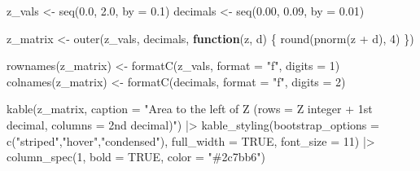 \documentclass[
  12pt,
  letterpaper,
]{book}
\newenvironment{Shaded}{\begin{snugshade}}{\end{snugshade}}
\newcommand{\AttributeTok}[1]{\textcolor[rgb]{0.40,0.45,0.13}{#1}}
\newcommand{\ConstantTok}[1]{\textcolor[rgb]{0.56,0.35,0.01}{#1}}
\newcommand{\ControlFlowTok}[1]{\textcolor[rgb]{0.00,0.23,0.31}{\textbf{#1}}}
\newcommand{\DecValTok}[1]{\textcolor[rgb]{0.68,0.00,0.00}{#1}}
\newcommand{\FloatTok}[1]{\textcolor[rgb]{0.68,0.00,0.00}{#1}}
\newcommand{\FunctionTok}[1]{\textcolor[rgb]{0.28,0.35,0.67}{#1}}
\newcommand{\NormalTok}[1]{\textcolor[rgb]{0.00,0.23,0.31}{#1}}
\newcommand{\OtherTok}[1]{\textcolor[rgb]{0.00,0.23,0.31}{#1}}
\newcommand{\SpecialCharTok}[1]{\textcolor[rgb]{0.37,0.37,0.37}{#1}}
\newcommand{\StringTok}[1]{\textcolor[rgb]{0.13,0.47,0.30}{#1}}
\begin{document}
\begin{Shaded}
\begin{Highlighting}[]
\NormalTok{z\_vals }\OtherTok{\textless{}{-}} \FunctionTok{seq}\NormalTok{(}\FloatTok{0.0}\NormalTok{, }\FloatTok{2.0}\NormalTok{, }\AttributeTok{by =} \FloatTok{0.1}\NormalTok{)}
\NormalTok{decimals }\OtherTok{\textless{}{-}} \FunctionTok{seq}\NormalTok{(}\FloatTok{0.00}\NormalTok{, }\FloatTok{0.09}\NormalTok{, }\AttributeTok{by =} \FloatTok{0.01}\NormalTok{)}

\NormalTok{z\_matrix }\OtherTok{\textless{}{-}} \FunctionTok{outer}\NormalTok{(z\_vals, decimals, }\ControlFlowTok{function}\NormalTok{(z, d) \{}
  \FunctionTok{round}\NormalTok{(}\FunctionTok{pnorm}\NormalTok{(z }\SpecialCharTok{+}\NormalTok{ d), }\DecValTok{4}\NormalTok{)}
\NormalTok{\})}

\FunctionTok{rownames}\NormalTok{(z\_matrix) }\OtherTok{\textless{}{-}} \FunctionTok{formatC}\NormalTok{(z\_vals, }\AttributeTok{format =} \StringTok{"f"}\NormalTok{, }\AttributeTok{digits =} \DecValTok{1}\NormalTok{)}
\FunctionTok{colnames}\NormalTok{(z\_matrix) }\OtherTok{\textless{}{-}} \FunctionTok{formatC}\NormalTok{(decimals, }\AttributeTok{format =} \StringTok{"f"}\NormalTok{, }\AttributeTok{digits =} \DecValTok{2}\NormalTok{)}

\FunctionTok{kable}\NormalTok{(z\_matrix, }\AttributeTok{caption =} \StringTok{"Area to the left of Z (rows = Z integer + 1st decimal, columns = 2nd decimal)"}\NormalTok{) }\SpecialCharTok{|\textgreater{}}
  \FunctionTok{kable\_styling}\NormalTok{(}\AttributeTok{bootstrap\_options =} \FunctionTok{c}\NormalTok{(}\StringTok{"striped"}\NormalTok{,}\StringTok{"hover"}\NormalTok{,}\StringTok{"condensed"}\NormalTok{),}
                \AttributeTok{full\_width =} \ConstantTok{TRUE}\NormalTok{, }\AttributeTok{font\_size =} \DecValTok{11}\NormalTok{) }\SpecialCharTok{|\textgreater{}}
  \FunctionTok{column\_spec}\NormalTok{(}\DecValTok{1}\NormalTok{, }\AttributeTok{bold =} \ConstantTok{TRUE}\NormalTok{, }\AttributeTok{color =} \StringTok{"\#2c7bb6"}\NormalTok{)}
\end{Highlighting}
\end{Shaded}
\end{document}

